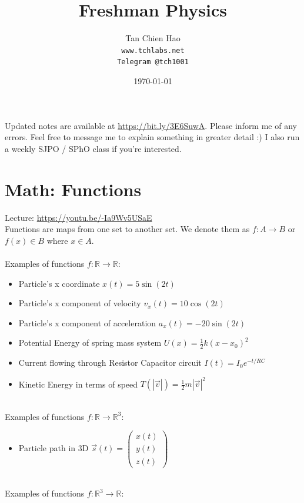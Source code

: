 \documentclass{article}
\title{Freshman Physics}
\author{
    Tan Chien Hao\\
    \texttt{www.tchlabs.net}\\
    \texttt{Telegram @tch1001}
}
\date{\today}
\begin{document}
\newif\ifpaper

\paperfalse 

\maketitle

Updated notes are available at \url{https://bit.ly/3E6SuwA}. Please inform me of any errors. Feel free to message me to explain something in greater detail :) I also run a weekly SJPO / SPhO class if you're interested.
\tableofcontents

\section{Math: Functions}
Lecture: \url{https://youtu.be/-Ia9Wv5USaE}\\[10pt]
Functions are maps from one set to another set. We denote them as $f: A \rightarrow B$ or $f(x) \in B$ where $x\in A$. \\
\\
Examples of functions $f: \mathbb R \to \mathbb R$:
\begin{itemize}
    \item Particle's x coordinate $x(t) = 5 \sin (2t)$
    \item Particle's x component of velocity $v_x(t) = 10 \cos (2t)$
    \item Particle's x component of acceleration $a_x(t) = - 20 \sin (2t)$
    \item Potential Energy of spring mass system $U(x) = \frac{1}{2} k(x-x_0)^2$
    \item Current flowing through Resistor Capacitor circuit $I(t) = I_0 e^{-{t}/{RC}}$
    \item Kinetic Energy in terms of speed $T(|\vec{v}|) = \frac{1}{2} m |\vec{v}|^2$
\end{itemize}
\leavevmode \\
Examples of functions $f: \mathbb R \to \mathbb R^3$:
\begin{itemize}
    \item Particle path in 3D $\vec{s}(t) = \left(\begin{array}{l}
         x(t) \\
         y(t) \\
         z(t) 
    \end{array}\right) $
\end{itemize}
\leavevmode \\
Examples of functions $f: \mathbb R^3 \to \mathbb R$:
\end{document}

